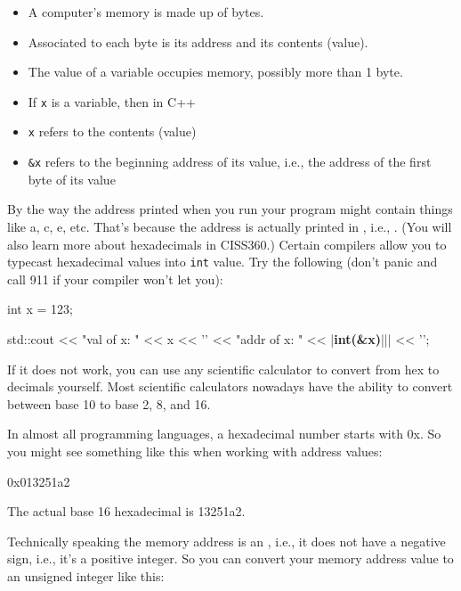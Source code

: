 \begin{itemize}
\item
  A computer's memory is made up of bytes.
\item
  Associated to each byte is its address and its contents (value).
\item
  The value of a variable occupies memory, possibly more than 1 byte.
\item
  If \texttt{x} is a variable, then in C++
\item
  \texttt{x} refers to the contents (value)
\item
  \texttt{\&x} refers to the beginning address of its value, i.e., the
  address of the first byte of its value
\end{itemize}

By the way the address printed when you run your program might contain things like a, c, e, etc. That's because the address is actually printed in , i.e., . (You will also learn more about hexadecimals in CISS360.) Certain compilers allow you to typecast hexadecimal values into \texttt{int} value. Try the following (don't panic and call 911 if your compiler won't let you):

\begin{consolethree}[escapeinside=||]
int x = 123;

std::cout << "val of x: " << x
          << '\n' << "addr of x: " << |\textbf{int(\&x)}|||
          << '\n';
\end{consolethree}

If it does not work, you can use any scientific calculator to convert from hex to decimals yourself. Most scientific calculators nowadays have the ability to convert between base 10 to base 2, 8, and 16.

In almost all programming languages, a hexadecimal number starts with 0x. So you might see something like this when working with address values:
\begin{center}
0x013251a2
\end{center}
The actual base 16 hexadecimal is 13251a2.

Technically speaking the memory address is an , i.e., it does not have a negative sign, i.e., it's a positive integer. So you can convert your memory address value to an unsigned integer like this:

